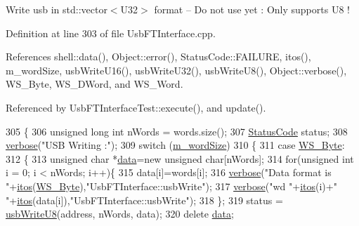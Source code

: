 Write usb in std\+::vector$<$\+U32$>$ format -- Do not use yet \+: Only supports U8 ! 

Definition at line 303 of file Usb\+F\+T\+Interface.\+cpp.



References shell\+::data(), Object\+::error(), Status\+Code\+::\+F\+A\+I\+L\+U\+RE, itos(), m\+\_\+word\+Size, usb\+Write\+U16(), usb\+Write\+U32(), usb\+Write\+U8(), Object\+::verbose(), W\+S\+\_\+\+Byte, W\+S\+\_\+\+D\+Word, and W\+S\+\_\+\+Word.



Referenced by Usb\+F\+T\+Interface\+Test\+::execute(), and update().


\begin{DoxyCode}
305 \{
306   \textcolor{keywordtype}{unsigned} \textcolor{keywordtype}{long} \textcolor{keywordtype}{int} nWords = words.size();
307   \hyperlink{classStatusCode}{StatusCode} status;
308   \hyperlink{classObject_a83d2db2df682907ea1115ad721c1c4a1}{verbose}(\textcolor{stringliteral}{"USB Writing :"});
309   \textcolor{keywordflow}{switch} (\hyperlink{classUsbFTInterface_a05ccc38a60c4b921b835238b604b38d8}{m\_wordSize})
310   \{
311   \textcolor{keywordflow}{case} \hyperlink{classUsbFTInterface_a057387f452eaac094fb77ba09cf1cf2ea32efe2feb6728578134aa9b85b97d1b9}{WS\_Byte}:
312     \{
313       \textcolor{keywordtype}{unsigned} \textcolor{keywordtype}{char} *\hyperlink{namespaceshell_a5ea2525995cedc3efd69ea8a7f034d1e}{data}=\textcolor{keyword}{new} \textcolor{keywordtype}{unsigned} \textcolor{keywordtype}{char}[nWords];
314       \textcolor{keywordflow}{for}(\textcolor{keywordtype}{unsigned} \textcolor{keywordtype}{int} i = 0; i < nWords; i++)\{
315         data[i]=words[i];
316         \hyperlink{classObject_a83d2db2df682907ea1115ad721c1c4a1}{verbose}(\textcolor{stringliteral}{"Data format is "}+\hyperlink{Tools_8h_af330027dbdafb9a30768b3613c553e60}{itos}(\hyperlink{classUsbFTInterface_a057387f452eaac094fb77ba09cf1cf2ea32efe2feb6728578134aa9b85b97d1b9}{WS\_Byte}),\textcolor{stringliteral}{"UsbFTInterface::usbWrite"});
317         \hyperlink{classObject_a83d2db2df682907ea1115ad721c1c4a1}{verbose}(\textcolor{stringliteral}{"wd "}+\hyperlink{Tools_8h_af330027dbdafb9a30768b3613c553e60}{itos}(i)+\textcolor{stringliteral}{" "}+\hyperlink{Tools_8h_af330027dbdafb9a30768b3613c553e60}{itos}(data[i]),\textcolor{stringliteral}{"UsbFTInterface::usbWrite"});
318       \};
319       status = \hyperlink{classUsbFTInterface_a8aeebce6a10aa88c19cfa663b47b389a}{usbWriteU8}(address, nWords, data);
320       \textcolor{keyword}{delete} \hyperlink{namespaceshell_a5ea2525995cedc3efd69ea8a7f034d1e}{data};

\end{DoxyCode}
